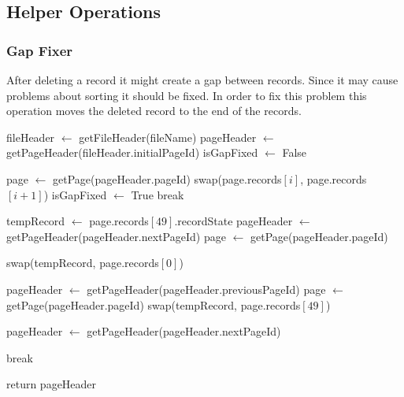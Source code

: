 \documentclass{article}
\begin{document}
\newpage
\subsection{Helper Operations}
\subsubsection{Gap Fixer}
After deleting a record it might create a gap between records. Since it may cause problems about sorting it should be fixed. In order to fix this problem this operation moves the deleted record to the end of the records. 

\begin{algorithm}[H]
    {
        fileHeader $\gets$ getFileHeader(fileName)\;
        pageHeader $\gets$ getPageHeader(fileHeader.initialPageId)\;
        isGapFixed $\gets$ False\;
        {
            page $\gets$ getPage(pageHeader.pageId)\;
            {
                {
                    swap(page.records$[i]$, page.records$[i+1]$)
                }
                {
                    isGapFixed $\gets$ True\;
                    break
                }
            }
            
            {
                tempRecord $\gets$ page.records$[49]$.recordState\;
                pageHeader $\gets$ getPageHeader(pageHeader.nextPageId)\;
                page $\gets$ getPage(pageHeader.pageId)\;
                {
                    swap(tempRecord, page.records$[0]$)\;
                    
                    pageHeader $\gets$ getPageHeader(pageHeader.previousPageId)\;
                    page $\gets$ getPage(pageHeader.pageId)\;
                    swap(tempRecord, page.records$[49]$)\;
                    
                    pageHeader $\gets$ getPageHeader(pageHeader.nextPageId)\;
                }
                {
                    break
                }
            }
        }  
        
        return pageHeader
    }
\end{algorithm}
\newpage
\end{document}
